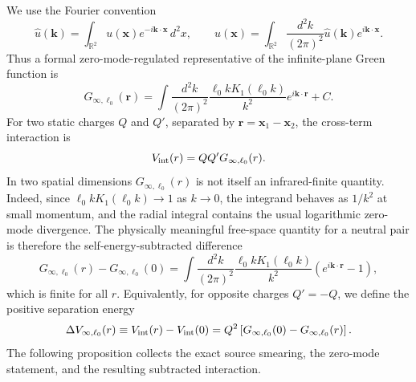 \documentclass[openacc]{rsproca_new}%
\begin{document}
We use the Fourier convention
\begin{equation}
  \widehat u(\mathbf k)=\int_{\mathbb R^2}u(\mathbf x)e^{-i\mathbf k\cdot\mathbf x}\,d^2x,
  \qquad
  u(\mathbf x)=\int_{\mathbb R^2}\frac{d^2k}{(2\pi)^2}\widehat u(\mathbf k)e^{i\mathbf k\cdot\mathbf x}.
\end{equation}
Thus a formal zero-mode-regulated representative of the infinite-plane Green function is
\begin{equation}
  G_{\infty,\ell_0}(\mathbf r)
  =\int\frac{d^2 k}{(2\pi)^2}\frac{\ell_0 k K_1(\ell_0 k)}{k^2}e^{i\mathbf k\cdot \mathbf r}+C.
\end{equation}
For two static charges $Q$ and $Q'$, separated by $\mathbf r=\mathbf x_1-\mathbf x_2$, the cross-term interaction is
\begin{equation}
  V_{\rm int}(r)=Q Q' G_{\infty,\ell_0}(r).
\end{equation}
In two spatial dimensions $G_{\infty,\ell_0}(r)$ is not itself an infrared-finite quantity. Indeed, since $\ell_0 k K_1(\ell_0 k)\to 1$ as $k\to 0$, the integrand behaves as $1/k^2$ at small momentum, and the radial integral contains the usual logarithmic zero-mode divergence. The physically meaningful free-space quantity for a neutral pair is therefore the self-energy-subtracted difference
\begin{equation}
  G_{\infty,\ell_0}(r)-G_{\infty,\ell_0}(0)
  =\int\frac{d^2 k}{(2\pi)^2}\frac{\ell_0 k K_1(\ell_0 k)}{k^2}
  \left(e^{i\mathbf k\cdot\mathbf r}-1\right),
\end{equation}
which is finite for all $r$. Equivalently, for opposite charges $Q'=-Q$, we define the positive separation energy
\begin{equation}
  \Delta V_{\infty,\ell_0}(r)
  \equiv V_{\rm int}(r)-V_{\rm int}(0)
  =Q^2\left[G_{\infty,\ell_0}(0)-G_{\infty,\ell_0}(r)\right].
\end{equation}
The following proposition collects the exact source smearing, the zero-mode statement, and the resulting subtracted interaction.
\end{document}
